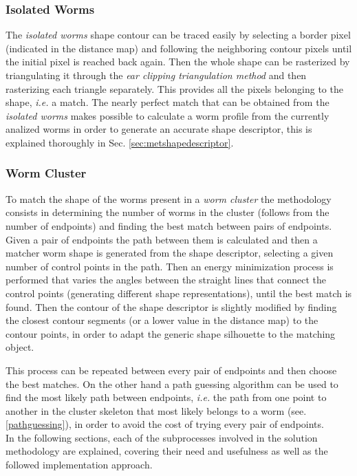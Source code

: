 \subsubsection*{Isolated Worms}
The \emph{isolated worms} shape contour can be traced easily by selecting a border pixel
(indicated in the distance map) and following the neighboring contour pixels until the
initial pixel is reached back again. Then the whole shape can be rasterized by 
triangulating it through the \emph{ear clipping triangulation method} and then rasterizing
each triangle separately. This provides all the pixels belonging to the shape, 
\emph{i.e.} a match.
The nearly perfect match that can be obtained from the \emph{isolated worms} makes 
possible to calculate a worm profile from the currently analized worms in order to
generate an accurate shape descriptor, this is explained thoroughly in 
Sec. \ref{sec:metshapedescriptor}.

\subsubsection*{Worm Cluster}
To match the shape of the worms present in a \emph{worm cluster} the methodology consists
in determining the number of worms in the cluster (follows from the number of
endpoints) and finding the best match between pairs of endpoints. Given a pair of 
endpoints the path between them is calculated and then a matcher worm shape is generated
from the shape descriptor, selecting a given number of control points in the path.
Then an energy minimization process is performed that varies the angles between the 
straight lines that connect the control points (generating different shape representations),
until the best match is found. Then the contour of the shape descriptor is slightly 
modified by finding the closest contour segments (or a lower value in the distance map)
to the contour points, in order to adapt the generic shape silhouette to 
the matching object. 

This process can be repeated between every pair of endpoints and then choose the 
best matches. On the other hand a path guessing algorithm
can be used to find the most likely path between endpoints, \emph{i.e.} the path from
one point to another in the cluster skeleton that most likely belongs to a worm 
(see. \ref{pathguessing}), in order to avoid the cost of trying every pair of endpoints.\\

In the following sections, each of the subprocesses involved in the solution
methodology are explained, covering their need and usefulness as
well as the followed implementation approach.

